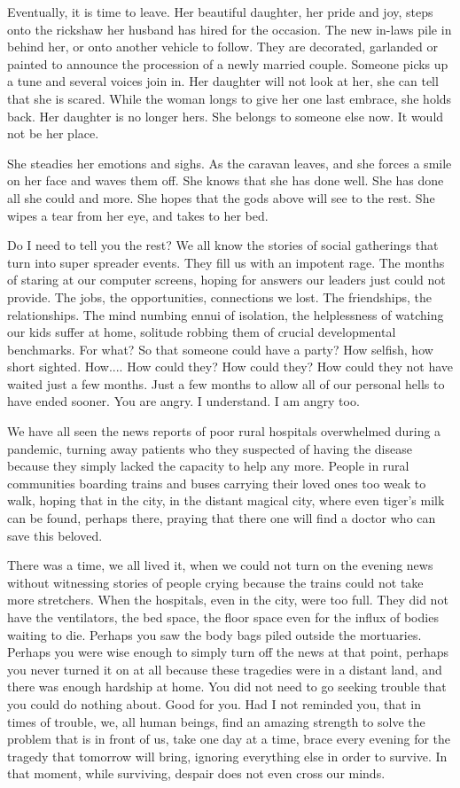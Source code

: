 \documentclass{amsart}
\begin{document}
Eventually, it is time to leave. Her beautiful daughter, her pride and joy, steps onto the rickshaw her husband has hired for the occasion. The new in-laws pile in behind her, or onto another vehicle to follow. They are decorated, garlanded or painted to announce the procession of a newly married couple. Someone picks up a tune and several voices join in. Her daughter will not look at her, she can tell that she is scared. While the woman longs to give her one last embrace, she holds back. Her daughter is no longer hers. She belongs to someone else now. It would not be her place. 

She steadies her emotions and sighs. As the caravan leaves, and she forces a smile on her face and waves them off. She knows that she has done well. She has done all she could and more. She hopes that the gods above will see to the rest. She wipes a tear from her eye, and takes to her bed. 

Do I need to tell you the rest? We all know the stories of social gatherings that turn into super spreader events. They fill us with an impotent rage. The months of staring at our computer screens, hoping for answers our leaders just could not provide. The jobs, the opportunities, connections we lost. The friendships, the relationships. The mind numbing ennui of isolation, the helplessness of watching our kids suffer at home, solitude robbing them of crucial developmental benchmarks. For what? So that someone could have a party? How selfish, how short sighted. How.... How could they? How could they? How could they not have waited just a few months. Just a few months to allow all of our personal hells to have ended sooner. You are angry. I understand. I am angry too. 

We have all seen the news reports of poor rural hospitals overwhelmed during a pandemic, turning away patients who they suspected of having the disease because they simply lacked the capacity to help any more. People in rural communities boarding trains and buses carrying their loved ones too weak to walk, hoping that in the city, in the distant magical city, where even tiger's milk can be found, perhaps there, praying that there one will find a doctor who can save this beloved. 

There was a time, we all lived it, when we could not turn on the evening news without witnessing stories of people crying because the trains could not take more stretchers. When the hospitals, even in the city, were too full. They did not have the ventilators, the bed space, the floor space even for the influx of bodies waiting to die. Perhaps you saw the body bags piled outside the mortuaries. Perhaps you were wise enough to simply turn off the news at that point, perhaps you never turned it on at all because these tragedies were in a distant land, and there was enough hardship at home. You did not need to go seeking trouble that you could do nothing about. Good for you. Had I not reminded you, that in times of trouble, we, all human beings, find an amazing strength to solve the problem that is in front of us, take one day at a time, brace every evening for the tragedy that tomorrow will bring, ignoring everything else in order to survive. In that moment, while surviving, despair does not even cross our minds.
\end{document}
